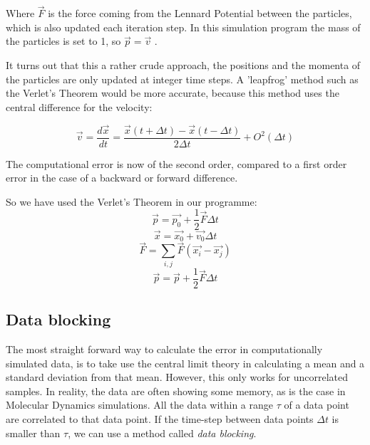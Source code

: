 \documentclass[a4paper,twoside,12pt]{article}
\begin{document}
\noindent Where $\vec{F}$ is the force coming from the Lennard Potential between the particles, which is also updated each iteration step. In this simulation program the mass of the particles is set to 1, so $\vec{p}=\vec{v}$ .
\vspace{5mm}

\noindent It turns out that this a rather crude approach, the positions and the momenta of the particles are only updated at integer time steps. A 'leapfrog' method such as the Verlet's Theorem would be more accurate, because this method uses the central difference for the velocity:

\begin{equation}
\vec{v}=\frac{d\vec{x}}{dt}=\frac{\vec{x}(t+\Delta t)-\vec{x}(t-\Delta t)}{2\Delta t} +O^{2}(\Delta t)
\end{equation}

\noindent The computational error is now of the second order, compared to a first order error in the case of a backward  or forward difference. 

\noindent So we have used the Verlet's Theorem in our programme:
\begin{equation}
\vec{p} = \vec{p_0}+\frac{1}{2}\vec{F}\Delta t
\end{equation}
\begin{equation}
\vec{x}=\vec{x_0}+\vec{v_0}\Delta t
\end{equation}
\begin{equation}
\vec{F}=\sum_{i,j}\vec{F}(\vec{x_i}-\vec{x_j})
\end{equation}
\begin{equation}
\vec{p} = \vec{p}+\frac{1}{2}\vec{F}\Delta t
\end{equation}

\subsection{Data blocking}\label{sec:data}

The most straight forward way to calculate the error in computationally simulated data, is to take use the central limit theory in calculating a mean and a standard deviation from that mean. However, this only works for uncorrelated samples. In reality, the data are often showing some memory, as is the case in Molecular Dynamics simulations. All the data within a range $\tau$ of a data point are correlated to that data point. If the time-step between data points $\Delta t$ is smaller than $\tau$, we can use a method called \textit{data blocking}.
\vspace{5mm}
\end{document}
